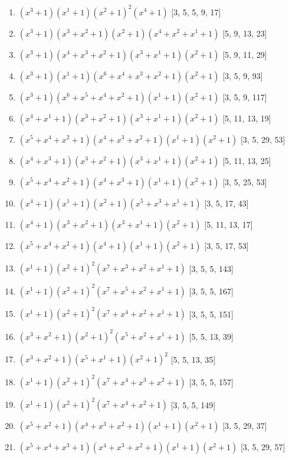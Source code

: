\documentclass[10pt,twocolumn]{article}
\begin{document}
\begin{enumerate}
\item $(x^{3} + 1)(x^{1} + 1)(x^{2} + 1)^{2}(x^{4} + 1)$  [3, 5, 5, 9, 17]
\item $(x^{3} + 1)(x^{3} + x^{2} + 1)(x^{2} + 1)(x^{4} + x^{2} + x^{1} + 1)$  [5, 9, 13, 23]
\item $(x^{3} + 1)(x^{4} + x^{3} + x^{2} + 1)(x^{3} + x^{1} + 1)(x^{2} + 1)$  [5, 9, 11, 29]
\item $(x^{3} + 1)(x^{1} + 1)(x^{6} + x^{4} + x^{3} + x^{2} + 1)(x^{2} + 1)$  [3, 5, 9, 93]
\item $(x^{3} + 1)(x^{6} + x^{5} + x^{4} + x^{2} + 1)(x^{1} + 1)(x^{2} + 1)$  [3, 5, 9, 117]
\item $(x^{4} + x^{1} + 1)(x^{3} + x^{2} + 1)(x^{3} + x^{1} + 1)(x^{2} + 1)$  [5, 11, 13, 19]
\item $(x^{5} + x^{4} + x^{2} + 1)(x^{4} + x^{3} + x^{2} + 1)(x^{1} + 1)(x^{2} + 1)$  [3, 5, 29, 53]
\item $(x^{4} + x^{3} + 1)(x^{3} + x^{2} + 1)(x^{3} + x^{1} + 1)(x^{2} + 1)$  [5, 11, 13, 25]
\item $(x^{5} + x^{4} + x^{2} + 1)(x^{4} + x^{3} + 1)(x^{1} + 1)(x^{2} + 1)$  [3, 5, 25, 53]
\item $(x^{4} + 1)(x^{1} + 1)(x^{2} + 1)(x^{5} + x^{3} + x^{1} + 1)$  [3, 5, 17, 43]
\item $(x^{4} + 1)(x^{3} + x^{2} + 1)(x^{3} + x^{1} + 1)(x^{2} + 1)$  [5, 11, 13, 17]
\item $(x^{5} + x^{4} + x^{2} + 1)(x^{4} + 1)(x^{1} + 1)(x^{2} + 1)$  [3, 5, 17, 53]
\item $(x^{1} + 1)(x^{2} + 1)^{2}(x^{7} + x^{3} + x^{2} + x^{1} + 1)$  [3, 5, 5, 143]
\item $(x^{1} + 1)(x^{2} + 1)^{2}(x^{7} + x^{5} + x^{2} + x^{1} + 1)$  [3, 5, 5, 167]
\item $(x^{1} + 1)(x^{2} + 1)^{2}(x^{7} + x^{4} + x^{2} + x^{1} + 1)$  [3, 5, 5, 151]
\item $(x^{3} + x^{2} + 1)(x^{2} + 1)^{2}(x^{5} + x^{2} + x^{1} + 1)$  [5, 5, 13, 39]
\item $(x^{3} + x^{2} + 1)(x^{5} + x^{1} + 1)(x^{2} + 1)^{2}$  [5, 5, 13, 35]
\item $(x^{1} + 1)(x^{2} + 1)^{2}(x^{7} + x^{4} + x^{3} + x^{2} + 1)$  [3, 5, 5, 157]
\item $(x^{1} + 1)(x^{2} + 1)^{2}(x^{7} + x^{4} + x^{2} + 1)$  [3, 5, 5, 149]
\item $(x^{5} + x^{2} + 1)(x^{4} + x^{3} + x^{2} + 1)(x^{1} + 1)(x^{2} + 1)$  [3, 5, 29, 37]
\item $(x^{5} + x^{4} + x^{3} + 1)(x^{4} + x^{3} + x^{2} + 1)(x^{1} + 1)(x^{2} + 1)$  [3, 5, 29, 57]

\end{enumerate}
\end{document}
